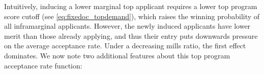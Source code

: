 \documentclass[12pt,reqno]{amsart}
\theoremstyle{definition}
\theoremstyle{plain} %
\begin{document}
\noindent Intuitively, inducing a lower marginal top applicant requires a lower top program score cutoff (see \eqref{eq:fixedoc_topdemand}), which raises the winning probability of all inframarginal applicants. However, the newly induced applicants have lower merit than those already applying, and thus their entry puts downwards pressure on the average acceptance rate. Under a decreasing mills ratio, the first effect dominates. We now note two additional features about this top program acceptance rate function:


% 

\end{document}
